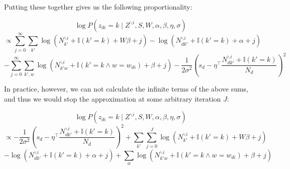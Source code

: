\documentclass[a4paper,10pt]{article}
\begin{document}
Putting these together gives us the following proportionality:

\[ \log P(z_{di} = k \mid Z^{\backslash{i}}, S, W, \alpha, \beta, \eta, \sigma)  \]
\[\propto \sum_{j=0}^\infty \sum_{k'}\log(N_{k'}^{\backslash i} + \mathbb{I}(k' = k) + W \beta + j) -\log(N_{d{k'}}^{\backslash i} + \mathbb{I}(k' = k) + \alpha +j)\]
\[-\sum_{j=0}^\infty \sum_{k',w} \log(N_{{k'}w}^{\backslash i} + \mathbb{I}(k' = k \wedge w = w_{di}) + \beta + j) -\frac{1}{2 \sigma^2}\left(s_d - \eta^\top \frac{N_{d{k'}}^{\backslash i} + \mathbb{I}(k' = k)}{N_d}\right)^2\]

In practice, however, we can not calculate the infinite terms of the above sums, and thus we would stop the approximation at some arbitrary iteration $J$:

\[ \log P(z_{di} = k \mid Z^{\backslash{i}}, S, W, \alpha, \beta, \eta, \sigma) \]
\[ \propto -\frac{1}{2 \sigma^2}\left(s_d - \eta^\top \frac{N_{d{k'}}^{\backslash i} + \mathbb{I}(k' = k)}{N_d}\right)^2 + \sum_{k'} \sum_{j=0}^J \log(N_{k'}^{\backslash i} + \mathbb{I}(k' = k) + W \beta + j) \]
\[ -\log(N_{d{k'}}^{\backslash i} + \mathbb{I}(k' = k) + \alpha +j) + \sum_{w} \log(N_{{k'}w}^{\backslash i} + \mathbb{I}(k' = k \wedge w = w_{di}) + \beta + j) \]
\end{document}
